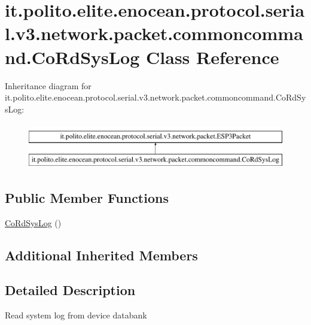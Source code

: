 \hypertarget{classit_1_1polito_1_1elite_1_1enocean_1_1protocol_1_1serial_1_1v3_1_1network_1_1packet_1_1commoncommand_1_1_co_rd_sys_log}{}\section{it.\+polito.\+elite.\+enocean.\+protocol.\+serial.\+v3.\+network.\+packet.\+commoncommand.\+Co\+Rd\+Sys\+Log Class Reference}
\label{classit_1_1polito_1_1elite_1_1enocean_1_1protocol_1_1serial_1_1v3_1_1network_1_1packet_1_1commoncommand_1_1_co_rd_sys_log}
Inheritance diagram for it.\+polito.\+elite.\+enocean.\+protocol.\+serial.\+v3.\+network.\+packet.\+commoncommand.\+Co\+Rd\+Sys\+Log\+:\begin{figure}[H]
\begin{center}
\leavevmode
\includegraphics[height=2.000000cm]{classit_1_1polito_1_1elite_1_1enocean_1_1protocol_1_1serial_1_1v3_1_1network_1_1packet_1_1commoncommand_1_1_co_rd_sys_log}
\end{center}
\end{figure}
\subsection*{Public Member Functions}
\begin{DoxyCompactItemize}
\item 
\hyperlink{classit_1_1polito_1_1elite_1_1enocean_1_1protocol_1_1serial_1_1v3_1_1network_1_1packet_1_1commoncommand_1_1_co_rd_sys_log_a93637ef900d9fd20540e22678f14d2d9}{Co\+Rd\+Sys\+Log} ()
\end{DoxyCompactItemize}
\subsection*{Additional Inherited Members}


\subsection{Detailed Description}
Read system log from device databank

